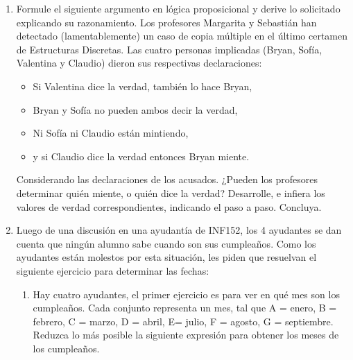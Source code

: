 \documentclass[letterpaper,10pt]{article}
\begin{document}
\begin{enumerate}
    \item Formule el siguiente argumento en lógica proposicional y derive lo solicitado explicando su razonamiento.
    Los profesores Margarita y Sebastián han detectado (lamentablemente) un caso de copia múltiple en el último certamen de Estructuras Discretas. Las cuatro personas implicadas (Bryan, Sofía, Valentina y Claudio) dieron sus respectivas declaraciones: 
    \begin{itemize}
        \item Si Valentina dice la verdad, también lo hace Bryan,
        \item Bryan y Sofía no pueden ambos decir la verdad,
        \item Ni Sofía ni Claudio están mintiendo,
        \item y si Claudio dice la verdad entonces Bryan miente.
    \end{itemize}
    Considerando las declaraciones de los acusados. ¿Pueden los profesores determinar quién miente, o quién dice la verdad? Desarrolle, e infiera los valores de verdad correspondientes, indicando el paso a paso. Concluya.
    
    \item Luego de una discusión en una ayudantía de INF152, los 4 ayudantes se dan cuenta que ningún alumno sabe cuando son sus cumpleaños. Como los ayudantes están molestos por esta situación, les piden que resuelvan el siguiente ejercicio para determinar las fechas:
    \begin{enumerate}
       \item Hay cuatro ayudantes, el primer ejercicio es para ver en qué mes son los cumpleaños. Cada conjunto representa un mes, tal que A = enero, B = febrero, C = marzo, D = abril, E= julio, F = agosto, G = septiembre. Reduzca lo más posible la siguiente expresión para obtener los meses de los cumpleaños.
        

\end{enumerate}
\end{enumerate}
\end{document}
